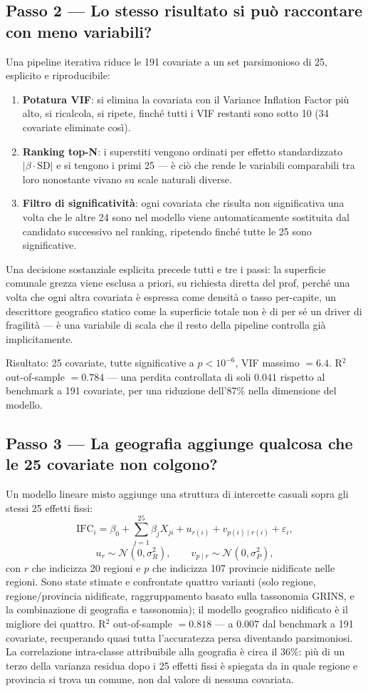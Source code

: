\documentclass[11pt,a4paper]{article}
\begin{document}
\subsection*{Passo 2 --- Lo stesso risultato si può raccontare con
meno variabili?}
Una pipeline iterativa riduce le 191 covariate a un set parsimonioso
di 25, esplicito e riproducibile:
\begin{enumerate}[leftmargin=2em]
  \item \textbf{Potatura VIF}: si elimina la covariata con il
  Variance Inflation Factor più alto, si ricalcola, si ripete, finché
  tutti i VIF restanti sono sotto 10 (34 covariate eliminate così).
  \item \textbf{Ranking top-N}: i superstiti vengono ordinati per
  effetto standardizzato $|\beta \cdot \mathrm{SD}|$ e si tengono i
  primi 25 --- è ciò che rende le variabili comparabili tra loro
  nonostante vivano su scale naturali diverse.
  \item \textbf{Filtro di significatività}: ogni covariata che
  risulta non significativa una volta che le altre 24 sono nel
  modello viene automaticamente sostituita dal candidato successivo
  nel ranking, ripetendo finché tutte le 25 sono significative.
\end{enumerate}
Una decisione sostanziale esplicita precede tutti e tre i passi: la
superficie comunale grezza viene esclusa a priori, su richiesta
diretta del prof, perché una volta che ogni altra covariata è
espressa come densità o tasso per-capite, un descrittore geografico
statico come la superficie totale non è di per sé un driver di
fragilità --- è una variabile di scala che il resto della pipeline
controlla già implicitamente.

Risultato: 25 covariate, tutte significative a $p < 10^{-6}$, VIF
massimo $= 6.4$. R$^2$ out-of-sample $= 0.784$ --- una perdita
controllata di soli $0.041$ rispetto al benchmark a 191 covariate,
per una riduzione dell'87\% nella dimensione del modello.

\subsection*{Passo 3 --- La geografia aggiunge qualcosa che le 25
covariate non colgono?}
Un modello lineare misto aggiunge una struttura di intercette
casuali sopra gli stessi 25 effetti fissi:
$$
\text{IFC}_i = \beta_0 + \sum_{j=1}^{25}\beta_j X_{ji} +
u_{r(i)} + v_{p(i)\mid r(i)} + \varepsilon_i,
$$
$$
u_r \sim \mathcal{N}(0,\sigma_R^2), \qquad
v_{p\mid r} \sim \mathcal{N}(0,\sigma_P^2),
$$
con $r$ che indicizza 20 regioni e $p$ che indicizza 107 provincie
nidificate nelle regioni. Sono state stimate e confrontate quattro
varianti (solo regione, regione/provincia nidificate, raggruppamento
basato sulla tassonomia GRINS, e la combinazione di geografia e
tassonomia); il modello geografico nidificato è il migliore dei
quattro. R$^2$ out-of-sample $= 0.818$ --- a $0.007$ dal benchmark a
191 covariate, recuperando quasi tutta l'accuratezza persa
diventando parsimoniosi. La correlazione intra-classe attribuibile
alla geografia è circa il 36\%: più di un terzo della varianza
residua dopo i 25 effetti fissi è spiegata da in quale regione e
provincia si trova un comune, non dal valore di nessuna covariata.
\end{document}
